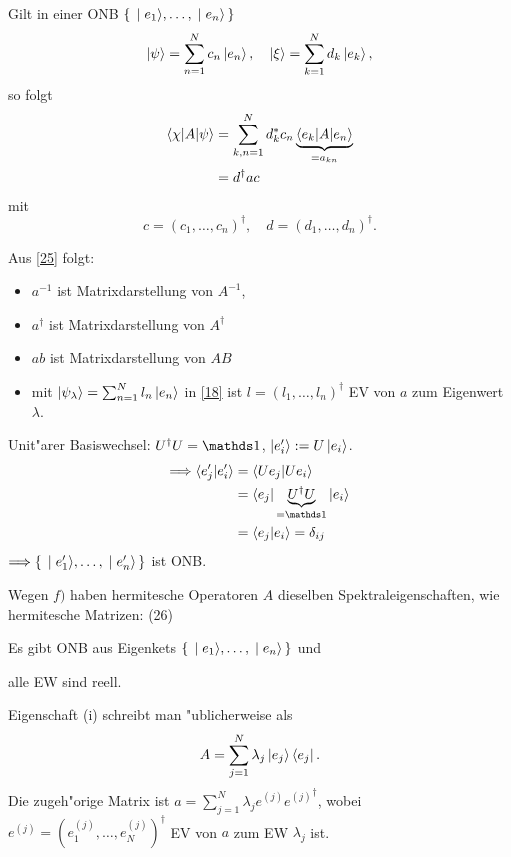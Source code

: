 \documentclass[a4paper]{scrartcl}
\begin{document}
{\begin{aaufz}
\item Gilt in einer ONB $\set{ \ket{e_1}, \ldots, \ket{e_n} }$
\begin{align}
\ket \psi = \sum_{n=1}^N c_n \ket {e_n}, \quad \ket \xi = \sum_{k=1}^N d_k \ket {e_k}, 
\end{align}
so folgt
\begin{align}
\begin{split}
\braket{ \chi | A | \psi } & = \sum_{k,n =1}^N d_k^* c_n \underbrace{\braket{ e_k | A | e_n}}_{=a_{kn}} \\
& = d^\dagger a c
\end{split} \label{25}
\end{align}
mit $$c=(c_1, \ldots, c_n)^\dagger, \quad d = (d_1, \ldots, d_n)^\dagger.$$
\item Aus \ref{25} folgt: \label{f}
\begin{itemize}
\item $a^{-1}$ ist Matrixdarstellung von $A^{-1}$,
\item $a^\dagger$ ist Matrixdarstellung von $A^\dagger$
\item $ab$ ist Matrixdarstellung von $AB$
\item mit $\ket{ \psi_\lambda } = \sum_{n=1}^N l_n \ket{e_n}$ in \ref{18} ist $l = (l_1, \ldots, l_n)^\dagger$ EV von $a$ zum Eigenwert $\lambda$.
\end{itemize}
\item Unit"arer Basiswechsel: $U^\dagger U = \dOne$, $\ket{e_i'} := U \ket{e_i}$. 
\begin{align*}
\Longrightarrow \braket{ e_j' | e_i' } & = \braket{ U e_j | U e_i } \\ 
& = \braket {e_j | \underbrace{U^\dagger U}_{= \dOne} | e_i } \\
& = \braket { e_j | e_i } = \delta_{ij}
\end{align*}
$\Longrightarrow \set{ \ket{ e_1'}, \ldots, \ket{e_n'}}$ ist ONB.

Wegen $f)$ haben hermitesche Operatoren $A$ dieselben Spektraleigenschaften, wie hermitesche Matrizen: (26)
\begin{iaufz}
\item Es gibt ONB aus Eigenkets $\set{ \ket{e_1}, \ldots, \ket{e_n}}$ und
\item alle EW sind reell.
\end{iaufz}
\setcounter{equation}{26}
\end{aaufz}
Eigenschaft (i) schreibt man "ublicherweise als 
\begin{align}
A = \sum_{j=1}^N \lambda_j \ket {e_j} \bra{e_j}.
\end{align}
Die zugeh"orige Matrix ist $a = \sum_{j=1}^N \lambda_j e^{(j)}  {e^{(j)}}^\dagger$, wobei $e^{(j)} = (e_1^{(j)}, \ldots, e_N^{(j)})^\dagger$ EV von $a$ zum EW $\lambda_j$ ist.

}
\end{document}

